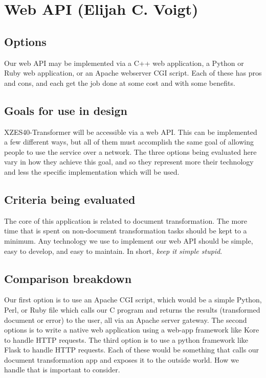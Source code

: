 \section{Web API (Elijah C. Voigt)}

\subsection{Options}

Our web API may be implemented via a C++ web application, a Python or Ruby web application, or an Apache webserver CGI script.
Each of these has pros and cons, and each get the job done at some cost and with some benefits.

\subsection{Goals for use in design}

XZES40-Transformer will be accessible via a web API.
This can be implemented a few different ways, but all of them must accomplish the same goal of allowing people to use the service over a network.
The three options being evaluated here vary in how they achieve this goal, and so they represent more their technology and less the specific implementation which will be used.

\subsection{Criteria being evaluated}

The core of this application is related to document transformation.
The more time that is spent on non-document transformation tasks should be kept to a minimum.
Any technology we use to implement our web API should be simple, easy to develop, and easy to maintain.
In short, \textit{keep it simple stupid}.

\subsection{Comparison breakdown}

Our first option is to use an Apache CGI script, which would be a simple Python, Perl, or Ruby file which calls our C program and returns the results (transformed document or error) to the user, all via an Apache server gateway.
The second options is to write a native web application using a web-app framework like Kore to handle HTTP requests.
The third option is to use a python framework like Flask to handle HTTP requests.
Each of these would be something that calls our document transformation app and exposes it to the outside world.
How we handle that is important to consider.

